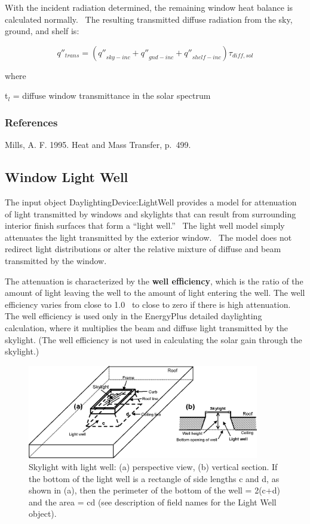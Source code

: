 With the incident radiation determined, the remaining window heat balance is calculated normally.~ The resulting transmitted diffuse radiation from the sky, ground, and shelf is:

\begin{equation}
{q''_{trans}} = \left( {{{q''}_{sky - inc}} + {{q''}_{gnd - inc}} + {{q''}_{shelf - inc}}} \right){\tau_{diff,sol}}
\end{equation}

where

t\(_{l}\) = diffuse window transmittance in the solar spectrum

\subsubsection{References}\label{references-1-006}

Mills, A. F. 1995. Heat and Mass Transfer, p.~499.

\subsection{Window Light Well}\label{window-light-well}

The input object DaylightingDevice:LightWell provides a model for attenuation of light transmitted by windows and skylights that can result from surrounding interior finish surfaces that form a ``light well.''~ The light well model simply attenuates the light transmitted by the exterior window.~ The model does not redirect light distributions or alter the relative mixture of diffuse and beam transmitted by the window.

The attenuation is characterized by the \textbf{well efficiency}, which is the ratio of the amount of light leaving the well to the amount of light entering the well. The well efficiency varies from close to 1.0~ to close to zero if there is high attenuation. The well efficiency is used only in the EnergyPlus detailed daylighting calculation, where it multiplies the beam and diffuse light transmitted by the skylight. (The well efficiency is not used in calculating the solar gain through the skylight.)

\begin{figure}[hbtp] %
\centering
\includegraphics[width=0.9\textwidth, height=0.9\textheight, keepaspectratio=true]{media/image907.png}
\caption{Skylight with light well: (a) perspective view, (b) vertical section. If the bottom of the light well is a rectangle of side lengths c and d, as shown in (a), then the perimeter of the bottom of the well = 2(c+d) and the area = cd (see description of field names for the Light Well object). \protect \label{fig:skylight-with-light-well-a-perspective-view-b}}
\end{figure}

